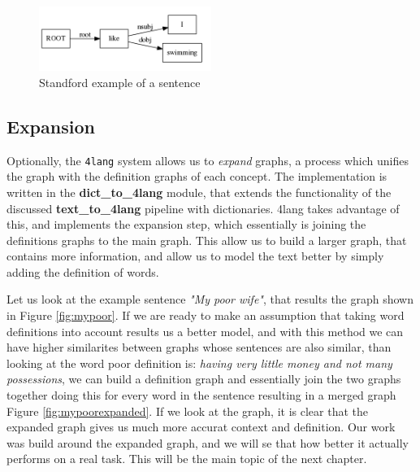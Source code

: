 \begin{figure}[h]
	\centering
	\includegraphics[width=0.5\textwidth]{figures/swimmingdep}
	\caption{Standford example of a sentence}
	\label{fig:swimmingdep}
\end{figure}


\subsection{Expansion}
Optionally, the \texttt{4lang} system allows us to \textit{expand}
graphs, a process which unifies the graph with the definition graphs of
each concept. The implementation is written in the \textbf{dict\_to\_4lang} module, that extends the functionality of the discussed \textbf{text\_to\_4lang} pipeline with dictionaries. 4lang takes advantage of this, and implements the expansion step, which essentially is joining the definitions graphs to the main graph. This allow us to build a larger graph, that contains more information, and allow us to model the text better by simply adding the definition of words.

Let us look at the example sentence \textit{"My poor wife"}, that results the graph shown in Figure \ref{fig:mypoor}. If we are ready to make an assumption that taking word definitions into account results us a better model, and with this method we can have higher similarites between graphs whose sentences are also similar, than looking at the word poor definition is: \textit{having very little money and not many possessions}, we can build a definition graph and essentially join the two graphs together doing this for every word in the sentence resulting in a merged graph Figure \ref{fig:mypoorexpanded}. If we look at the graph, it is clear that the expanded graph gives us much more accurat context and definition. Our work was build around the expanded graph, and we will se that how better it actually performs on a real task. This will be the main topic of the next chapter.

